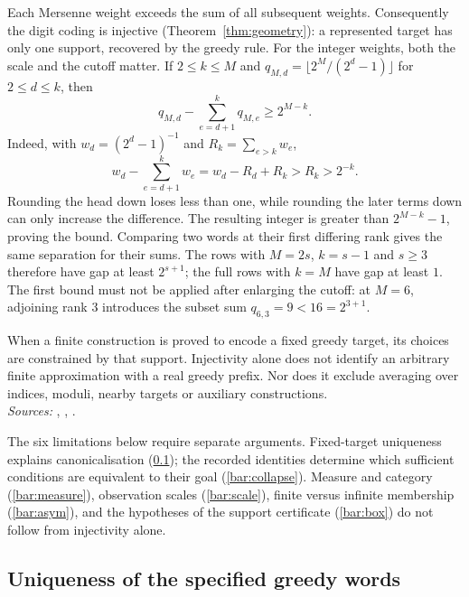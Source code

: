 \begin{obs}
\label{obs:no-ensemble}
Each Mersenne weight exceeds the sum of all subsequent weights.
Consequently the digit coding is injective (Theorem~\ref{thm:geometry}):
a represented target has only one support, recovered by the greedy rule.
For the integer weights, both the scale and the cutoff matter.  If
$2\le k\le M$ and
$q_{M,d}=\lfloor2^M/(2^d-1)\rfloor$ for $2\le d\le k$, then
\[
 q_{M,d}-\sum_{e=d+1}^{k}q_{M,e}\ge2^{M-k}.
\]
Indeed, with $w_d=(2^d-1)^{-1}$ and $R_k=\sum_{e>k}w_e$,
\[
 w_d-\sum_{e=d+1}^{k}w_e=w_d-R_d+R_k>R_k>2^{-k}.
\]
Rounding the head down loses less than one, while rounding the later
terms down can only increase the difference.  The resulting integer
is greater than $2^{M-k}-1$, proving the bound.  Comparing two words at
their first differing rank gives the same separation for their sums.
The rows with $M=2s$, $k=s-1$ and $s\ge3$ therefore have gap at least
$2^{s+1}$; the full rows with $k=M$ have gap at least $1$.
The first bound must not be applied after enlarging the cutoff:
at $M=6$, adjoining rank $3$ introduces the subset sum
$q_{6,3}=9<16=2^{3+1}$.

When a finite construction is proved to encode a fixed greedy target,
its choices are constrained by that support.  Injectivity alone does
not identify an arbitrary finite approximation with a real greedy
prefix.  Nor does it exclude averaging over indices, moduli, nearby
targets or auxiliary constructions.
\\
\textit{Sources:} ,
,
.
\end{obs}

The six limitations below require separate arguments.  Fixed-target
uniqueness explains canonicalisation (\ref{bar:canon}); the recorded
identities determine which sufficient conditions are equivalent to their
goal (\ref{bar:collapse}).  Measure and category (\ref{bar:measure}),
observation scales (\ref{bar:scale}), finite versus infinite membership
(\ref{bar:asym}), and the hypotheses of the support certificate
(\ref{bar:box}) do not follow from injectivity alone.

\subsection{Uniqueness of the specified greedy words}
\label{bar:canon}

